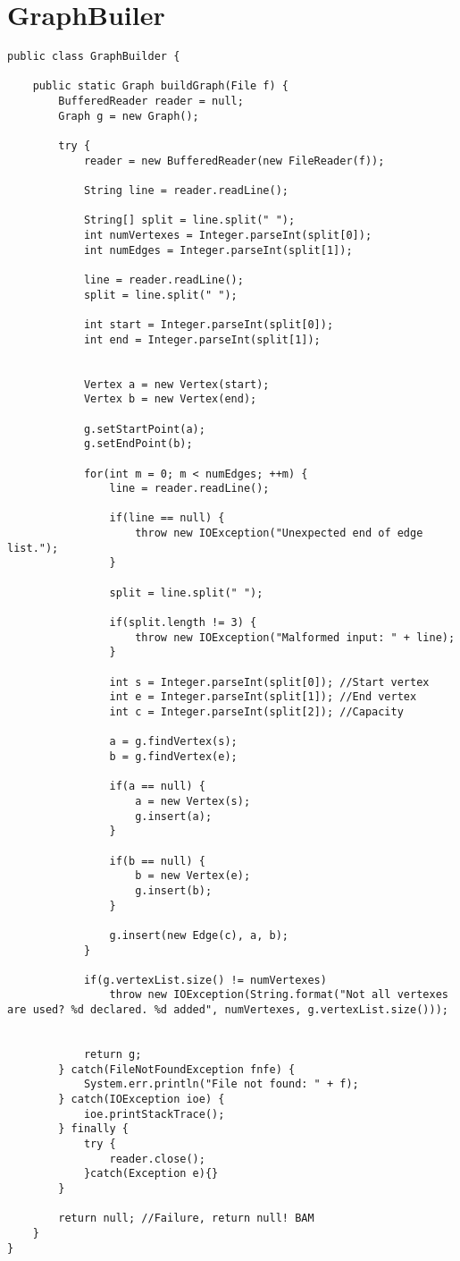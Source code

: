 \chapter{GraphBuiler}
\lstset{language=Java}
\begin{lstlisting}[caption=GraphBuiler Source Code]
public class GraphBuilder {

	public static Graph buildGraph(File f) {
		BufferedReader reader = null;
		Graph g = new Graph();
		
		try {
			reader = new BufferedReader(new FileReader(f));
			
			String line = reader.readLine();
			
			String[] split = line.split(" ");
			int numVertexes = Integer.parseInt(split[0]);
			int numEdges = Integer.parseInt(split[1]);
			
			line = reader.readLine();
			split = line.split(" ");
			
			int start = Integer.parseInt(split[0]);
			int end = Integer.parseInt(split[1]);
			
			
			Vertex a = new Vertex(start);
			Vertex b = new Vertex(end);
					
			g.setStartPoint(a);
			g.setEndPoint(b);
			
			for(int m = 0; m < numEdges; ++m) {
				line = reader.readLine();
				
				if(line == null) {
					throw new IOException("Unexpected end of edge list.");
				}
				
				split = line.split(" ");
				
				if(split.length != 3) {
					throw new IOException("Malformed input: " + line);
				}
				
				int s = Integer.parseInt(split[0]); //Start vertex
				int e = Integer.parseInt(split[1]); //End vertex
				int c = Integer.parseInt(split[2]); //Capacity
				
				a = g.findVertex(s);
				b = g.findVertex(e);
				
				if(a == null) {
					a = new Vertex(s);
					g.insert(a);
				}
				
				if(b == null) {
					b = new Vertex(e);
					g.insert(b);
				}
				
				g.insert(new Edge(c), a, b);
			}
			
			if(g.vertexList.size() != numVertexes)
				throw new IOException(String.format("Not all vertexes are used? %d declared. %d added", numVertexes, g.vertexList.size()));
			
			
			return g;
		} catch(FileNotFoundException fnfe) {
			System.err.println("File not found: " + f);
		} catch(IOException ioe) {
			ioe.printStackTrace();
		} finally {
			try {
				reader.close();
			}catch(Exception e){}
		}
		
		return null; //Failure, return null! BAM
	}
}
\end{lstlisting}